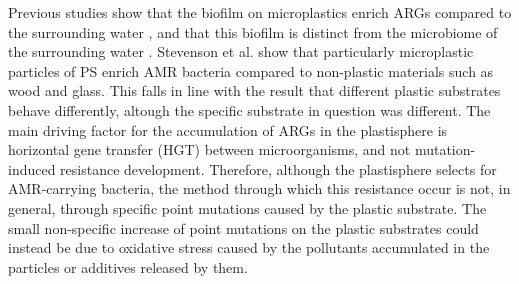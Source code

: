 

Previous studies show that the biofilm on microplastics  enrich ARGs compared to the surrounding water \cite{zhou2024MicroplasticBiofilmsPromote}, and that this biofilm is distinct from the microbiome of the surrounding water \cite{zadjelovic2023MicrobialHitchhikersHarbouring}. 
Stevenson et al.\cite{stevenson2024SelectionAntimicrobialResistance} show that particularly microplastic particles of PS enrich AMR bacteria compared to non-plastic materials such as wood and glass. This falls in line with the result that different plastic substrates behave differently, altough the specific substrate in question was different.%
The main driving factor for the accumulation of ARGs in the plastisphere is horizontal gene transfer (HGT)\cite{goswami2025MicroplasticsHiddenDrivers} between microorganisms, and not mutation-induced resistance development.
Therefore, although the plastisphere selects for AMR-carrying bacteria, the method through which this resistance occur is not, in general, through specific point mutations caused by the plastic substrate.
The small non-specific increase of point mutations on the plastic substrates could instead be due to oxidative stress caused by the pollutants accumulated in the particles or additives released by them\cite{forero-lopez2022PlastisphereMicroplasticsSitu, carvajal-garcia2023OxidativeStressDrives}.




% 
% 



